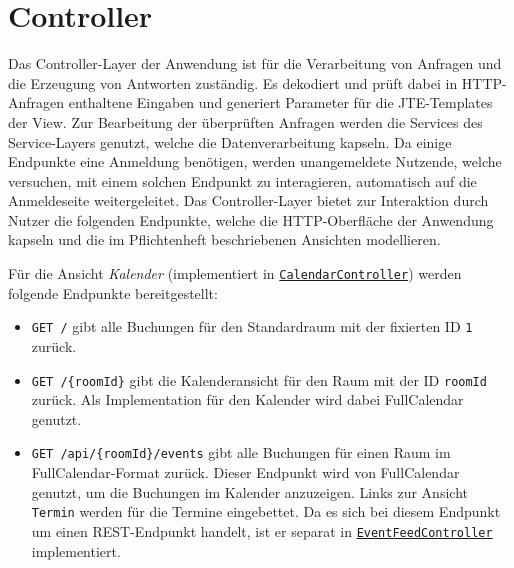 
\chapter{Controller}
\label{ch:controller}

Das Controller-Layer der Anwendung ist für die Verarbeitung von Anfragen und die Erzeugung von Antworten zuständig.
Es dekodiert und prüft dabei in \gls{HTTP}-Anfragen enthaltene Eingaben und generiert Parameter für die \gls{JTE}-Templates der View.
Zur Bearbeitung der überprüften Anfragen werden die Services des Service-Layers genutzt, welche die Datenverarbeitung kapseln.
Da einige Endpunkte eine Anmeldung benötigen, werden unangemeldete Nutzende, welche versuchen, mit einem solchen Endpunkt zu interagieren, automatisch auf die Anmeldeseite weitergeleitet.
Das Controller-Layer bietet zur Interaktion durch Nutzer die folgenden Endpunkte, welche die \gls{HTTP}-Oberfläche der Anwendung kapseln und die im Pflichtenheft beschriebenen Ansichten modellieren.

Für die Ansicht \textit{Kalender} (implementiert in \hyperref[edu.kit.hci.soli.controller.CalendarController]{\texttt{CalendarController}}) werden folgende Endpunkte bereitgestellt:
\begin{itemize}
    \item \texttt{GET /} gibt alle Buchungen für den Standardraum mit der fixierten ID \texttt{1} zurück.
    \item \texttt{GET /\{roomId\}} gibt die Kalenderansicht für den Raum mit der ID \texttt{roomId} zurück.
          Als Implementation für den Kalender wird dabei \gls{FullCalendar} genutzt.
    \item \texttt{GET /api/\{roomId\}/events} gibt alle Buchungen für einen Raum im \gls{FullCalendar}-Format zurück.
          Dieser Endpunkt wird von \gls{FullCalendar} genutzt, um die Buchungen im Kalender anzuzeigen.
          Links zur Ansicht \texttt{Termin} werden für die Termine eingebettet.
          Da es sich bei diesem Endpunkt um einen \gls{REST}-Endpunkt handelt, ist er separat in \hyperref[edu.kit.hci.soli.controller.EventFeedController]{\texttt{EventFeedController}} implementiert.
\end{itemize}

